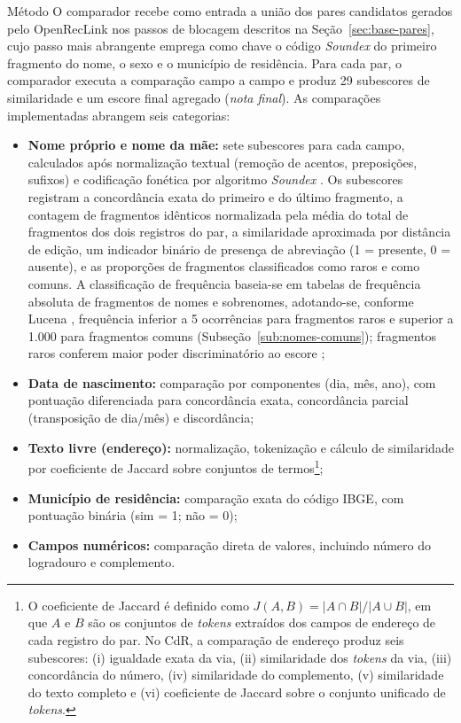 \begin{chapter}{Método}
O comparador recebe como entrada a união dos pares candidatos gerados pelo OpenRecLink nos passos de blocagem descritos na Seção~\ref{sec:base-pares}, cujo passo mais abrangente emprega como chave o código \textit{Soundex} do primeiro fragmento do nome, o sexo e o município de residência. Para cada par, o comparador executa a comparação campo a campo e produz 29 subescores de similaridade e um escore final agregado (\textit{nota final}). As comparações implementadas abrangem seis categorias:

\begin{itemize}
\item \textbf{Nome próprio e nome da mãe:} sete subescores para cada campo, calculados após normalização textual (remoção de acentos, preposições, sufixos) e codificação fonética por algoritmo \textit{Soundex} \cite{Christen2012book}. Os subescores registram a concordância exata do primeiro e do último fragmento, a contagem de fragmentos idênticos normalizada pela média do total de fragmentos dos dois registros do par, a similaridade aproximada por distância de edição, um indicador binário de presença de abreviação (1 = presente, 0 = ausente), e as proporções de fragmentos classificados como raros e como comuns. A classificação de frequência baseia-se em tabelas de frequência absoluta de fragmentos de nomes e sobrenomes, adotando-se, conforme Lucena \citeyearpar{Lucena2013algoritmos}, frequência inferior a 5 ocorrências para fragmentos raros e superior a 1.000 para fragmentos comuns (Subseção~\ref{sub:nomes-comuns}); fragmentos raros conferem maior poder discriminatório ao escore \cite{Winkler1990string};
\item \textbf{Data de nascimento:} comparação por componentes (dia, mês, ano), com pontuação diferenciada para concordância exata, concordância parcial (transposição de dia/mês) e discordância;
\item \textbf{Texto livre (endereço):} normalização, tokenização e cálculo de similaridade por coeficiente de Jaccard sobre conjuntos de termos\footnote{O coeficiente de Jaccard é definido como $J(A,B) = |A \cap B| / |A \cup B|$, em que $A$ e $B$ são os conjuntos de \textit{tokens} extraídos dos campos de endereço de cada registro do par. No CdR, a comparação de endereço produz seis subescores: (i) igualdade exata da via, (ii) similaridade dos \textit{tokens} da via, (iii) concordância do número, (iv) similaridade do complemento, (v) similaridade do texto completo e (vi) coeficiente de Jaccard sobre o conjunto unificado de \textit{tokens}.};
\item \textbf{Município de residência:} comparação exata do código IBGE, com pontuação binária (sim = 1; não = 0);
\item \textbf{Campos numéricos:} comparação direta de valores, incluindo número do logradouro e complemento.
\end{itemize}


\end{chapter}
